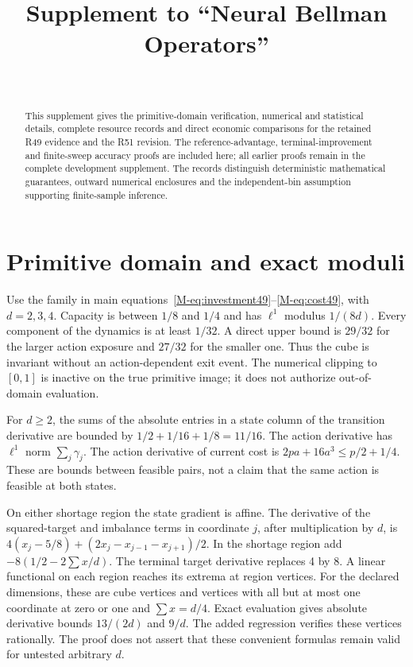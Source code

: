\documentclass[ecta,nameyear,draft]{econsocart}
\begin{document}
\begin{frontmatter}
\title{Supplement to ``Neural Bellman Operators''}
\begin{aug}\author[id=au1,addressref={add1}]{~}\address[id=add1]{Peking University}\end{aug}
\begin{abstract}
This supplement gives the primitive-domain verification, numerical and statistical details, complete resource records and direct economic comparisons for the retained R49 evidence and the R51 revision. The reference-advantage, terminal-improvement and finite-sweep accuracy proofs are included here; all earlier proofs remain in the complete development supplement. The records distinguish deterministic mathematical guarantees, outward numerical enclosures and the independent-bin assumption supporting finite-sample inference.
\end{abstract}\end{frontmatter}
\section{Primitive domain and exact moduli}\label{supp:primitive49}
Use the family in main equations~\eqref{M-eq:investment49}--\eqref{M-eq:cost49}, with $d=2,3,4$. Capacity is between $1/8$ and $1/4$ and has $\ell^1$ modulus $1/(8d)$. Every component of the dynamics is at least $1/32$. A direct upper bound is $29/32$ for the larger action exposure and $27/32$ for the smaller one. Thus the cube is invariant without an action-dependent exit event. The numerical clipping to $[0,1]$ is inactive on the true primitive image; it does not authorize out-of-domain evaluation.

For $d\ge2$, the sums of the absolute entries in a state column of the transition derivative are bounded by $1/2+1/16+1/8=11/16$. The action derivative has $\ell^1$ norm $\sum_j\gamma_j$. The action derivative of current cost is $2pa+16a^3\le p/2+1/4$. These are bounds between feasible pairs, not a claim that the same action is feasible at both states.

On either shortage region the state gradient is affine. The derivative of the squared-target and imbalance terms in coordinate $j$, after multiplication by $d$, is $4(x_j-5/8)+(2x_j-x_{j-1}-x_{j+1})/2$. In the shortage region add $-8(1/2-2\sum x/d)$. The terminal target derivative replaces 4 by 8. A linear functional on each region reaches its extrema at region vertices. For the declared dimensions, these are cube vertices and vertices with all but at most one coordinate at zero or one and $\sum x=d/4$. Exact evaluation gives absolute derivative bounds $13/(2d)$ and $9/d$. The added regression verifies these vertices rationally. The proof does not assert that these convenient formulas remain valid for untested arbitrary $d$.
\end{document}

